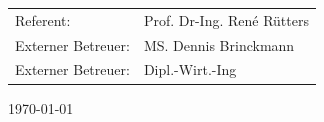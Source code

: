 \begin{titlepage}
	\vspace{2.1cm}

	\centering \begin{minipage}[t]{9cm}
		\centering \begin{tabular}{ll}
			Referent: & Prof. Dr-Ing. René Rütters\\
			Externer Betreuer: & MS. Dennis Brinckmann\\
			Externer Betreuer: & Dipl.-Wirt.-Ing
		\end{tabular}
	\end{minipage}

	\vspace{7cm}



	\centering %
	\begin{minipage}[b]{5cm}
			\centering
			\today\\ %
	\end{minipage}

	\restoregeometry
\end{titlepage}
